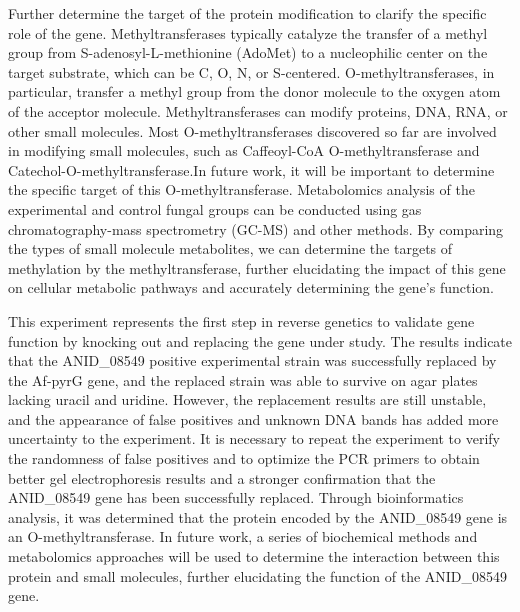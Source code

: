 \documentclass[a4paper,10pt]{article}
\begin{document}
\begin{multicols}{2}
Further determine the target of the protein modification to clarify the specific role of the gene. Methyltransferases typically catalyze the transfer of a methyl group from S-adenosyl-L-methionine (AdoMet) to a nucleophilic center on the target substrate\cite{ferrer2005crystal}, which can be C, O, N, or S-centered. O-methyltransferases, in particular, transfer a methyl group from the donor molecule to the oxygen atom of the acceptor molecule. Methyltransferases can modify proteins, DNA, RNA, or other small molecules. Most O-methyltransferases discovered so far are involved in modifying small molecules, such as Caffeoyl-CoA O-methyltransferase and Catechol-O-methyltransferase\cite{vidgren1994crystal}.In future work, it will be important to determine the specific target of this O-methyltransferase. Metabolomics analysis of the experimental and control fungal groups can be conducted using gas chromatography-mass spectrometry (GC-MS) and other methods\cite{david2008analysis}\cite{albright2015large}. By comparing the types of small molecule metabolites, we can determine the targets of methylation by the methyltransferase, further elucidating the impact of this gene on cellular metabolic pathways and accurately determining the gene's function.


This experiment represents the first step in reverse genetics to validate gene function by knocking out and replacing the gene under study. The results indicate that the ANID\_08549 positive experimental strain was successfully replaced by the Af-pyrG gene, and the replaced strain was able to survive on agar plates lacking uracil and uridine. However, the replacement results are still unstable, and the appearance of false positives and unknown DNA bands has added more uncertainty to the experiment. It is necessary to repeat the experiment to verify the randomness of false positives and to optimize the PCR primers to obtain better gel electrophoresis results and a stronger confirmation that the ANID\_08549 gene has been successfully replaced. Through bioinformatics analysis, it was determined that the protein encoded by the ANID\_08549 gene is an O-methyltransferase. In future work, a series of biochemical methods and metabolomics approaches will be used to determine the interaction between this protein and small molecules, further elucidating the function of the ANID\_08549 gene.


~\\
~\\



\end{multicols}
\end{document}
